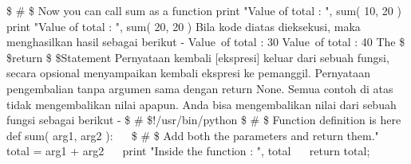    \$  \#  \$ Now you can call sum as a function 
 print "Value of total : ", sum( 10, 20 ) 
  print "Value of total : ", sum( 20, 20 ) 
Bila kode diatas dieksekusi, maka menghasilkan hasil sebagai berikut - 
 Value~of total :  30 
 Value~of total :  40 
The \$  \$return \$  \$Statement 
Pernyataan kembali [ekspresi] keluar dari sebuah fungsi, secara opsional menyampaikan kembali ekspresi ke pemanggil. Pernyataan pengembalian tanpa argumen sama dengan return None. 
Semua contoh di atas tidak mengembalikan nilai apapun. Anda bisa mengembalikan nilai dari sebuah fungsi sebagai berikut - 
  \$  \#  \$!/usr/bin/python 
  \$  \#  \$ Function definition is here 
 def sum( arg1, arg2 ): 
  ~~  \$  \#  \$ Add both the parameters and return them." 
  ~~ total = arg1 + arg2 
  ~~ print "Inside the function : ", total 
  ~~ return total; 
 
